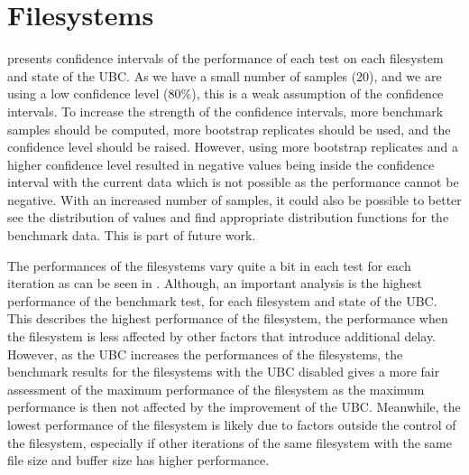 \section{Filesystems}
\label{sec:dis_fs}

 presents confidence intervals of the performance of each test on each filesystem and state of the \gls{UBC}. As we have a small number of samples (20), and we are using a low confidence level (80\%), this is a weak assumption of the confidence intervals. To increase the strength of the confidence intervals, more benchmark samples should be computed, more bootstrap replicates should be used, and the confidence level should be raised. However, using more bootstrap replicates and a higher confidence level resulted in negative values being inside the confidence interval with the current data which is not possible as the performance cannot be negative. With an increased number of samples, it could also be possible to better see the distribution of values and find appropriate distribution functions for the benchmark data. This is part of future work.

The performances of the filesystems vary quite a bit in each test for each iteration as can be seen in . Although, an important analysis is the highest performance of the benchmark test, for each filesystem and state of the \gls{UBC}. This describes the highest performance of the filesystem, \ie the performance when the filesystem is less affected by other factors that introduce additional delay. However, as the \gls{UBC} increases the performances of the filesystems, the benchmark results for the filesystems with the \gls{UBC} disabled gives a more fair assessment of the maximum performance of the filesystem as the maximum performance is then not affected by the improvement of the \gls{UBC}. Meanwhile, the lowest performance of the filesystem is likely due to factors outside the control of the filesystem, especially if other iterations of the same filesystem with the same file size and buffer size has higher performance.


